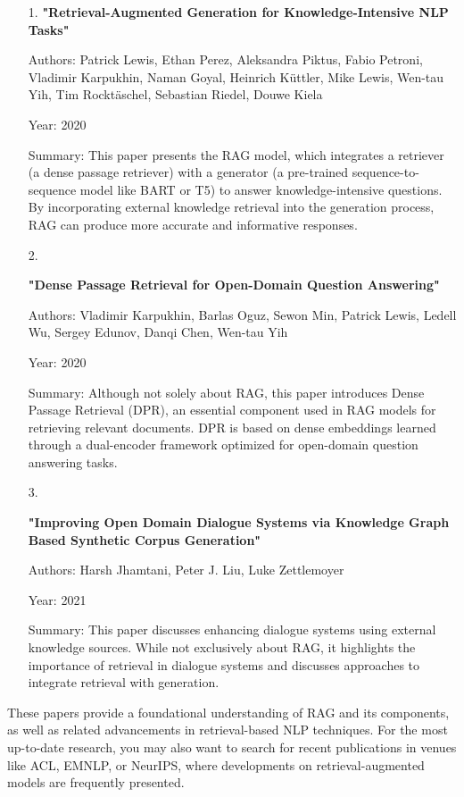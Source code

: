 \begin{itemize}
\setlength{\parskip}{0pt}
\item[1.]
{\bf "Retrieval-Augmented Generation for Knowledge-Intensive NLP Tasks"}

   Authors: Patrick Lewis, Ethan Perez, Aleksandra Piktus, Fabio Petroni, Vladimir Karpukhin, Naman Goyal, Heinrich Küttler, Mike Lewis, Wen-tau Yih, Tim Rocktäschel, Sebastian Riedel, Douwe Kiela  
   
   Year: 2020  
   
   Summary: This paper presents the RAG model, which integrates a retriever (a dense passage retriever) with a generator (a pre-trained sequence-to-sequence model like BART or T5) to answer knowledge-intensive questions. By incorporating external knowledge retrieval into the generation process, RAG can produce more accurate and informative responses.

\item[2.]

{\bf "Dense Passage Retrieval for Open-Domain Question Answering"}

   Authors: Vladimir Karpukhin, Barlas Oguz, Sewon Min, Patrick Lewis, Ledell Wu, Sergey Edunov, Danqi Chen, Wen-tau Yih  
   
   Year: 2020  
   
   Summary: Although not solely about RAG, this paper introduces Dense Passage Retrieval (DPR), an essential component used in RAG models for retrieving relevant documents. DPR is based on dense embeddings learned through a dual-encoder framework optimized for open-domain question answering tasks.

\item[3.]

{\bf "Improving Open Domain Dialogue Systems via Knowledge Graph Based Synthetic Corpus Generation"}

   Authors: Harsh Jhamtani, Peter J. Liu, Luke Zettlemoyer  
   
   Year: 2021  
   
   Summary: This paper discusses enhancing dialogue systems using external knowledge sources. While not exclusively about RAG, it highlights the importance of retrieval in dialogue systems and discusses approaches to integrate retrieval with generation.
\end{itemize}

These papers provide a foundational understanding of RAG and its components, as well as related advancements in retrieval-based NLP techniques. For the most up-to-date research, you may also want to search for recent publications in venues like ACL, EMNLP, or NeurIPS, where developments on retrieval-augmented models are frequently presented.

